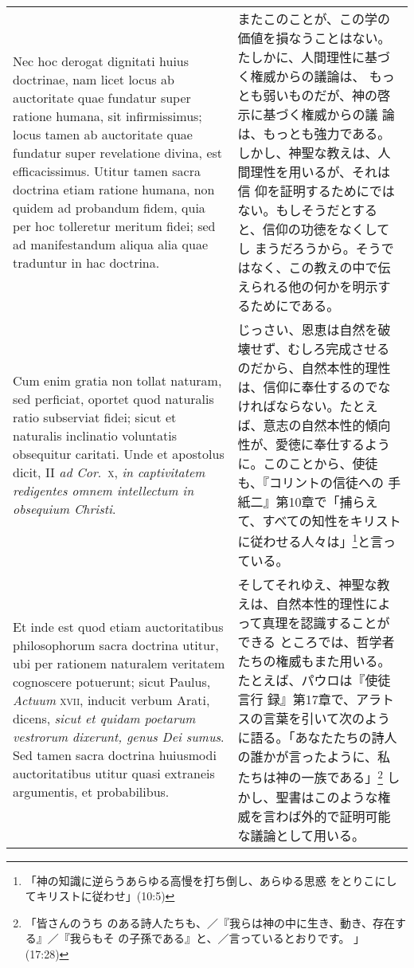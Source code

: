 \documentclass[10pt]{jsarticle} %
\begin{document}
\begin{longtable}{p{21em}p{21em}}
\\

Nec hoc derogat dignitati
huius doctrinae, nam licet locus ab auctoritate quae fundatur super
ratione humana, sit infirmissimus; locus tamen ab auctoritate quae
fundatur super revelatione divina, est efficacissimus. Utitur tamen
sacra doctrina etiam ratione humana, non quidem ad probandum fidem, quia
per hoc tolleretur meritum fidei; sed ad manifestandum aliqua alia quae
traduntur in hac doctrina. 


&


またこのことが、この学の価値を損なうことはない。たしかに、人間理性に基づ
 く権威からの議論は、 もっとも弱いものだが、神の啓示に基づく権威からの議
 論は、もっとも強力である。しかし、神聖な教えは、人間理性を用いるが、それは信
 仰を証明するためにではない。もしそうだとすると、信仰の功徳をなくしてし
 まうだろうから。そうではなく、この教えの中で伝えられる他の何かを明示す
 るためにである。



\\

Cum enim gratia non tollat naturam, sed
perficiat, oportet quod naturalis ratio subserviat fidei; sicut et
naturalis inclinatio voluntatis obsequitur caritati. Unde et apostolus
dicit, II {\itshape ad Cor}.~{\scshape x}, {\itshape in captivitatem redigentes omnem intellectum in
obsequium Christi}. 


&

じっさい、恩恵は自然を破壊せず、むしろ完成させるのだから、自然本性的理性
 は、信仰に奉仕するのでなければならない。たとえば、意志の自然本性的傾向
 性が、愛徳に奉仕するように。このことから、使徒も、『コリントの信徒への
 手紙二』第10章で「捕らえて、すべての知性をキリストに従わせる人々は」\footnote{「神の知識に逆らうあらゆる高慢を打ち倒し、あらゆる思惑
 をとりこにしてキリストに従わせ」(10:5)}と言っている。


\\

Et inde est quod etiam auctoritatibus philosophorum
sacra doctrina utitur, ubi per rationem naturalem veritatem cognoscere
potuerunt; sicut Paulus, {\itshape Actuum} {\scshape xvii}, inducit verbum Arati, dicens,
{\itshape sicut et quidam poetarum vestrorum dixerunt, genus Dei sumus}. Sed tamen
sacra doctrina huiusmodi auctoritatibus utitur quasi extraneis
argumentis, et probabilibus. 


&

そしてそれゆえ、神聖な教えは、自然本性的理性によって真理を認識することができる
 ところでは、哲学者たちの権威もまた用いる。たとえば、パウロは『使徒言行
 録』第17章で、アラトスの言葉を引いて次のように語る。「あなたたちの詩人
 の誰かが言ったように、私たちは神の一族である」\footnote{「皆さんのうち
 のある詩人たちも、／『我らは神の中に生き、動き、存在する』／『我らもそ
 の子孫である』と、／言っているとおりです。 」(17:28)}
しかし、聖書はこのような権威を言わば外的で証明可能な議論として用いる。



\end{longtable}
\end{document}
